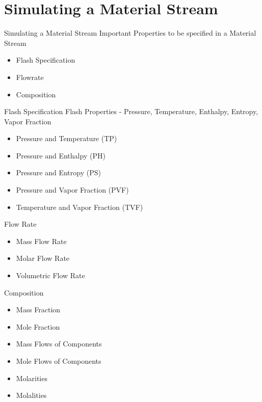 \documentclass[10pt]{beamer}
\begin{document}
\section{Simulating a Material Stream}
\begin{frame}{Simulating a Material Stream}
Important Properties to be specified in a Material Stream
\begin{itemize}
	\item Flash Specification
		\item Flowrate
	\item Composition
\end{itemize}	
\end{frame}

\begin{frame}{Flash Specification}
Flash Properties - Pressure, Temperature, Enthalpy, Entropy, Vapor Fraction
\vspace{3ex}
	\begin{itemize}
		\item Pressure and Temperature (TP)
		\item Pressure and Enthalpy (PH)
		\item Pressure and Entropy (PS)
		\item Pressure and Vapor Fraction (PVF)
		\item Temperature and Vapor Fraction (TVF)
	\end{itemize}	
\end{frame}

\begin{frame}{Flow Rate}
	\begin{itemize}
		\item Mass Flow Rate
		\item Molar Flow Rate
		\item Volumetric Flow Rate
	\end{itemize}	
\end{frame}

\begin{frame}{Composition}
	\begin{itemize}
		\item Mass Fraction
		\item Mole Fraction
		\item Mass Flows of Components
		\item Mole Flows of Components
		\item Molarities
		\item Molalities
	\end{itemize}	
\end{frame}
\end{document}

